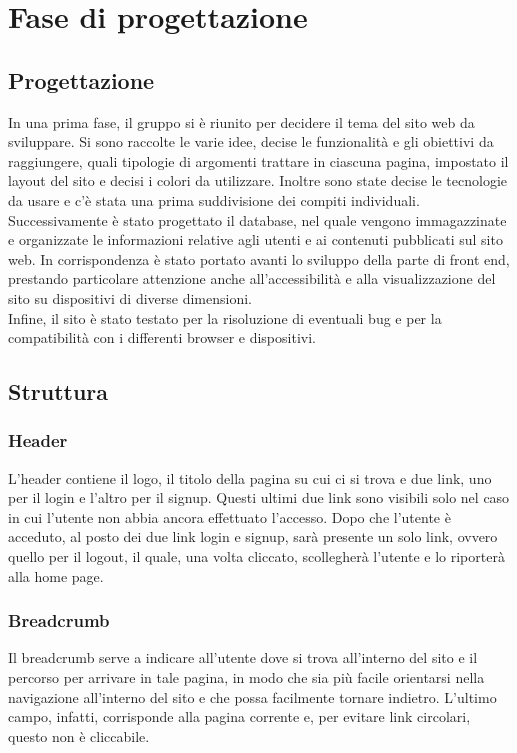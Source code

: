 \section{Fase di progettazione}
\subsection{Progettazione}
In una prima fase, il gruppo si è riunito per decidere il tema del sito web da sviluppare. Si sono raccolte le varie idee, decise le funzionalità e gli obiettivi da raggiungere, quali tipologie di argomenti trattare in ciascuna pagina, impostato il layout del sito e decisi i colori da utilizzare. Inoltre sono state decise le tecnologie da usare e c'è stata una prima suddivisione dei compiti individuali. \\
Successivamente è stato progettato il database, nel quale vengono immagazzinate e organizzate le informazioni relative agli utenti e ai contenuti pubblicati sul sito web. In corrispondenza è stato portato avanti lo sviluppo della parte di front end, prestando particolare attenzione anche all'accessibilità e alla visualizzazione del sito su dispositivi di diverse dimensioni. \\
Infine, il sito è stato testato per la risoluzione di eventuali bug e per la compatibilità con i differenti browser e dispositivi.
\subsection{Struttura}
\subsubsection{Header}
L'header contiene il logo, il titolo della pagina su cui ci si trova e due link, uno per il login e l'altro per il signup. Questi ultimi due link sono visibili solo nel caso in cui l'utente non abbia ancora effettuato l'accesso. Dopo che l'utente è acceduto, al posto dei due link login e signup, sarà presente un solo link, ovvero quello per il logout, il quale, una volta cliccato, scollegherà l'utente e lo riporterà alla home page. 
\subsubsection{Breadcrumb}
Il breadcrumb serve a indicare all'utente dove si trova all'interno del sito e il percorso per arrivare in tale pagina, in modo che sia più facile orientarsi nella navigazione all'interno del sito e che possa facilmente tornare indietro. L'ultimo campo, infatti, corrisponde alla pagina corrente e, per evitare link circolari, questo non è cliccabile.
